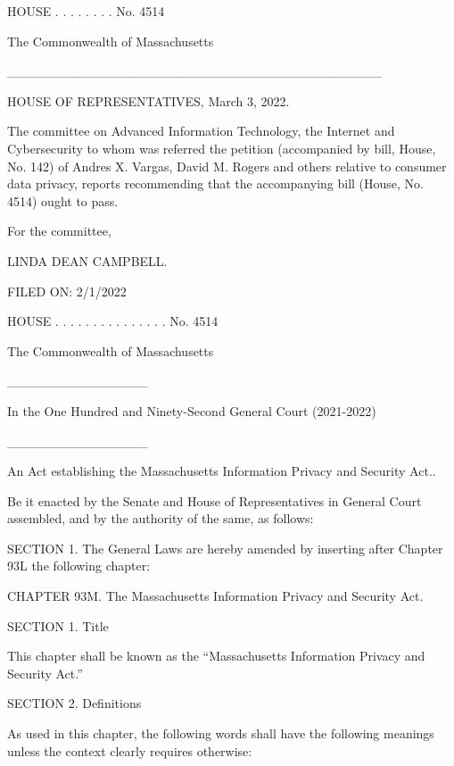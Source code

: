 HOUSE  .  .  .  .  .  .  .  .  No. 4514

 

The Commonwealth of Massachusetts

 

________________________________________

 

HOUSE OF REPRESENTATIVES, March 3, 2022.

The committee on Advanced Information Technology, the Internet and Cybersecurity to whom was referred the petition (accompanied by bill, House, No. 142) of Andres X. Vargas, David M. Rogers and others relative to consumer data privacy, reports recommending that the accompanying bill (House, No. 4514) ought to pass.

 

For the committee,

 

LINDA DEAN CAMPBELL.




        FILED ON: 2/1/2022

HOUSE  .  .  .  .  .  .  .  .  .  .  .  .  .  .  .  No. 4514

 

 

The Commonwealth of Massachusetts

 

_______________

In the One Hundred and Ninety-Second General Court
(2021-2022)

_______________

 

An Act establishing the Massachusetts Information Privacy and Security Act..

 

Be it enacted by the Senate and House of Representatives in General Court assembled, and by the authority of the same, as follows:
 

SECTION 1. The General Laws are hereby amended by inserting after Chapter 93L the following chapter:

CHAPTER 93M. The Massachusetts Information Privacy and Security Act.

SECTION 1. Title

This chapter shall be known as the “Massachusetts Information Privacy and Security Act.” 

SECTION 2. Definitions

As used in this chapter, the following words shall have the following meanings unless the context clearly requires otherwise:

